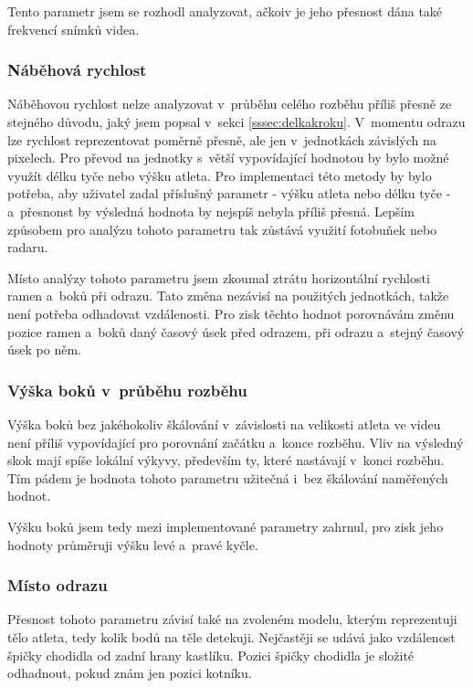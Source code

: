 Tento parametr jsem se rozhodl analyzovat, ačkoiv je jeho přesnost dána také frekvencí snímků videa.

\subsubsection{Náběhová rychlost}

Náběhovou rychlost nelze analyzovat v~průběhu celého rozběhu příliš přesně ze stejného důvodu, jaký jsem popsal v~sekci \ref{sssec:delkakroku}. V~momentu odrazu lze rychlost reprezentovat poměrně přesně, ale jen v~jednotkách závislých na pixelech. Pro převod na jednotky s~větší vypovídající hodnotou by bylo možné využít délku tyče nebo výšku atleta. Pro implementaci této metody by bylo potřeba, aby uživatel zadal příslušný parametr - výšku atleta nebo délku tyče - a~přesnonst by výsledná hodnota by nejspíš nebyla příliš přesná. Lepším způsobem pro analýzu tohoto parametru tak zůstává využití fotobuňek nebo radaru.

Místo analýzy tohoto parametru jsem zkoumal ztrátu horizontální rychlosti ramen a~boků při odrazu. Tato změna nezávisí na použitých jednotkách, takže není potřeba odhadovat vzdálenosti. Pro zisk těchto hodnot porovnávám změnu pozice ramen a~boků daný časový úsek před odrazem, při odrazu a~stejný časový úsek po něm.

\subsubsection{Výška boků v~průběhu rozběhu}

Výška boků bez jakéhokoliv škálování v~závislosti na velikosti atleta ve videu není příliš vypovídající pro porovnání začátku a~konce rozběhu. Vliv na výsledný skok mají spíše lokální výkyvy, především ty, které nastávají v~konci rozběhu. Tím pádem je hodnota tohoto parametru užitečná i~bez škálování naměřených hodnot.

Výšku boků jsem tedy mezi implementované parametry zahrnul, pro zisk jeho hodnoty průměruji výšku levé a~pravé kyčle.

\subsubsection{Místo odrazu}
\label{sssec:mistoodrazu}

Přesnost tohoto parametru závisí také na zvoleném modelu, kterým reprezentuji tělo atleta, tedy kolik bodů na těle detekuji. Nejčastěji se udává jako vzdálenost špičky chodidla od zadní hrany kastlíku. Pozici špičky chodidla je složité odhadnout, pokud znám jen pozici kotníku.

